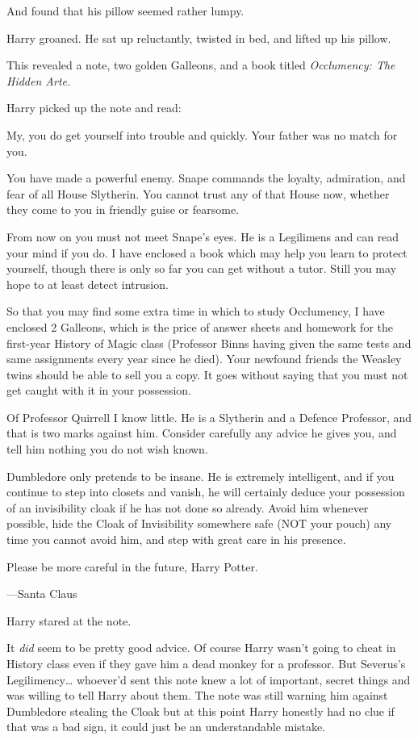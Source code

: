 And found that his pillow seemed rather lumpy.

Harry groaned. He sat up reluctantly, twisted in bed, and lifted up his pillow.

This revealed a note, two golden Galleons, and a book titled \emph{Occlumency:
The Hidden Arte.}

Harry picked up the note and read:

\begin{writtenNote}
My, you do get yourself into trouble and quickly. Your father was no
match for you.

You have made a powerful enemy. Snape commands the loyalty, admiration,
and fear of all House Slytherin. You cannot trust any of that House now,
whether they come to you in friendly guise or fearsome.

From now on you must not meet Snape's eyes. He is a Legilimens and can
read your mind if you do. I have enclosed a book which may help you learn to
protect yourself, though there is only so far you can get without a tutor.
Still you may hope to at least detect intrusion.

So that you may find some extra time in which to study Occlumency, I have
enclosed 2 Galleons, which is the price of answer sheets and homework for the
first-year History of Magic class (Professor Binns having given the same tests
and same assignments every year since he died). Your newfound friends the
Weasley twins should be able to sell you a copy. It goes without saying that
you must not get caught with it in your possession.

Of Professor Quirrell I know little. He is a Slytherin and a Defence
Professor, and that is two marks against him. Consider carefully any advice he
gives you, and tell him nothing you do not wish known.

Dumbledore only pretends to be insane. He is extremely intelligent, and
if you continue to step into closets and vanish, he will certainly deduce your
possession of an invisibility cloak if he has not done so already. Avoid him
whenever possible, hide the Cloak of Invisibility somewhere safe (NOT your
pouch) any time you cannot avoid him, and step with great care in his presence.

Please be more careful in the future, Harry Potter.

---Santa Claus
\end{writtenNote}

Harry stared at the note.

It \emph{did} seem to be pretty good advice. Of course Harry wasn't going to
cheat in History class even if they gave him a dead monkey for a professor. But
Severus's Legilimency{\ldots} whoever'd sent this note knew a lot of important,
secret things and was willing to tell Harry about them. The note was still
warning him against Dumbledore stealing the Cloak but at this point Harry
honestly had no clue if that was a bad sign, it could just be an understandable
mistake.

